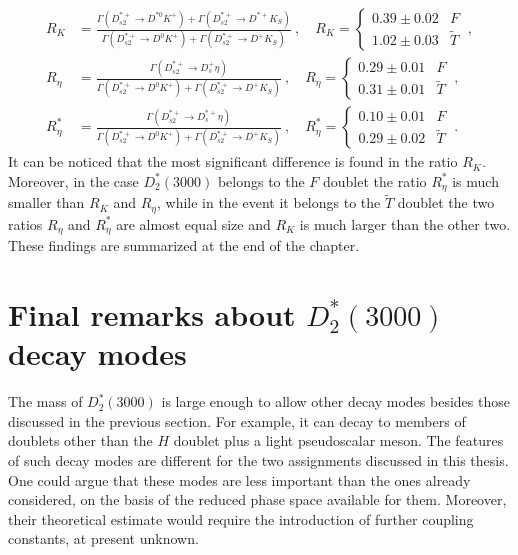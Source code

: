 \begin{subequations}
  \begin{align}
    R_K &= \frac{\Gamma \left( D_{s 2}^{* +} \rightarrow D^{* 0} K^+ \right) + \Gamma \left( D_{s 2}^{* +} \rightarrow D^{* +} K_S \right)}{\Gamma \left( D_{s 2}^{* +} \rightarrow D^0 K^+ \right) + \Gamma \left( D_{s 2}^{* +} \rightarrow D^+ K_S \right)} \ ,
    \quad
    R_K =
      \begin{cases}
        0.39 \pm 0.02 & F \\
        1.02 \pm 0.03 & \tilde{T} 
      \end{cases} \ , \\
    R_\eta &= \frac{\Gamma \left( D_{s 2}^{* +} \rightarrow D_s^+ \eta \right)}{\Gamma \left( D_{s 2}^{* +} \rightarrow D^0 K^+ \right) + \Gamma \left( D_{s 2}^{* +} \rightarrow D^+ K_S \right)} \ ,
  \quad
    R_\eta =
      \begin{cases}
        0.29 \pm 0.01 & F \\
        0.31 \pm 0.01 & \tilde{T} 
      \end{cases} \ , \\
    R^*_\eta &= \frac{\Gamma \left( D_{s 2}^{* +} \rightarrow D_s^{* +} \eta \right)}{\Gamma \left( D_{s 2}^{* +} \rightarrow D^0 K^+ \right) + \Gamma \left( D_{s 2}^{* +} \rightarrow D^+ K_S \right)} \ , 
   \quad 
    R^*_\eta =
      \begin{cases}
        0.10 \pm 0.01 & F \\
        0.29 \pm 0.02 & \tilde{T} 
      \end{cases} \ .
  \end{align}
  \label{eq:Rstrange}
\end{subequations}
It can be noticed that the most significant difference is found in the ratio $R_K$. Moreover, in the case $D^*_2(3000)$ belongs to the $F$ doublet the ratio $R_\eta^*$ is much smaller than $R_K$ and $R_\eta$, while in the event it belongs to the $\tilde{T}$ doublet the two ratios $R_\eta$ and $R_\eta^*$ are almost equal size and $R_K$ is much larger than the other two. These findings are summarized at the end of the chapter.

\section{Final remarks about $D_2^*(3000)$ decay modes}

The mass of $D^*_2(3000)$ is large enough to allow other decay modes besides those discussed in the previous section. For example, it can decay to members of doublets other than the $H$ doublet plus a light pseudoscalar meson. The features of such decay modes are different for the two assignments discussed in this thesis. One could argue that these modes are less important than the ones already considered, on the basis of the reduced phase space available for them. Moreover, their theoretical estimate would require the introduction of further coupling constants, at present unknown.

